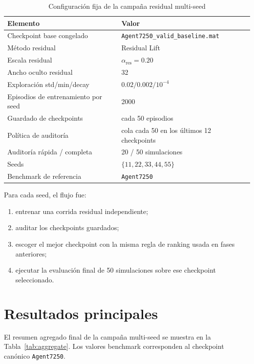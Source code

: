 \documentclass[11pt,a4paper]{article}
\begin{document}
\begin{table}[h!]
\centering
\caption{Configuraci\'on fija de la campa\~na residual multi-seed}
\begin{tabularx}{\linewidth}{lY}
\toprule
Elemento & Valor \\
\midrule
Checkpoint base congelado & \texttt{Agent7250\_valid\_baseline.mat} \\
M\'etodo residual & Residual Lift \\
Escala residual & $\alpha_{\mathrm{res}} = 0.20$ \\
Ancho oculto residual & 32 \\
Exploraci\'on std/min/decay & $0.02 / 0.002 / 10^{-4}$ \\
Episodios de entrenamiento por seed & 2000 \\
Guardado de checkpoints & cada 50 episodios \\
Pol\'itica de auditor\'ia & cola cada 50 en los \'ultimos 12 checkpoints \\
Auditor\'ia r\'apida / completa & 20 / 50 simulaciones \\
Seeds & $\{11, 22, 33, 44, 55\}$ \\
Benchmark de referencia & \texttt{Agent7250} \\
\bottomrule
\end{tabularx}
\end{table}

Para cada seed, el flujo fue:
\begin{enumerate}
    \item entrenar una corrida residual independiente;
    \item auditar los checkpoints guardados;
    \item escoger el mejor checkpoint con la misma regla de ranking usada en fases anteriores;
    \item ejecutar la evaluaci\'on final de 50 simulaciones sobre ese checkpoint seleccionado.
\end{enumerate}

\section*{Resultados principales}
El resumen agregado final de la campa\~na multi-seed se muestra en la Tabla~\ref{tab:aggregate}. Los valores benchmark corresponden al checkpoint can\'onico \texttt{Agent7250}.
\end{document}
